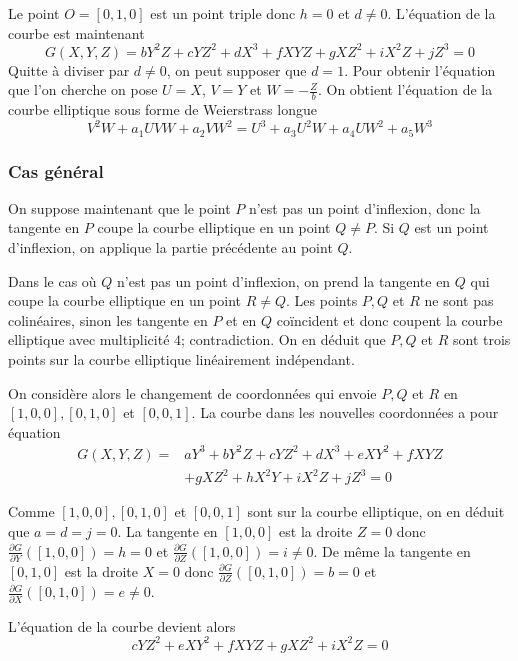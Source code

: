 \documentclass{article}
\begin{document}
Le point $O=[0,1,0]$ est un point triple donc $h=0$ et $d\neq0$. L'équation de la courbe est maintenant
\begin{equation*}
G(X,Y,Z) = bY^2Z + cYZ^2 + dX^3 + fXYZ + gXZ^2 + iX^2Z + jZ^3 = 0
\end{equation*}
Quitte à diviser par $d\neq 0$, on peut supposer que $d=1$. Pour obtenir l'équation que l'on cherche on pose
$U=X$, $V=Y$ et $W=-\frac{Z}{b}$. On obtient l'équation de la courbe elliptique sous forme de Weierstrass longue
\begin{equation*}
V^2W + a_{1}UVW + a_{2}VW^2 = U^3 + a_{3}U^2W + a_{4}UW^2 + a_{5}W^3
\end{equation*}

\subsubsection{Cas général}
On suppose maintenant que le point $P$ n'est pas un point d'inflexion, donc la tangente en $P$ coupe la courbe
elliptique en un point $Q\neq P$. Si $Q$ est un point d'inflexion, on applique la partie précédente au point $Q$.

Dans le cas où $Q$ n'est pas un point d'inflexion, on prend la tangente en $Q$ qui coupe la courbe elliptique 
en un point $R\neq Q$. Les points $P, Q$ et $R$ ne sont pas colinéaires, sinon les tangente en $P$ et en $Q$ coïncident
et donc coupent la courbe elliptique avec multiplicité $4$; contradiction. On en déduit que $P, Q$ et $R$ sont trois
points sur la courbe elliptique linéairement indépendant.

On considère alors le changement de coordonnées qui envoie
$P, Q$ et $R$ en $[1,0,0], [0,1,0]$ et $[0,0,1]$. La courbe dans les nouvelles coordonnées a pour équation
\begin{align*}
G(X,Y,Z) = &aY^3 + bY^2Z + cYZ^2 + dX^3 + eXY^2 + fXYZ \\
			& + gXZ^2 + hX^2Y + iX^2Z + jZ^3 = 0
\end{align*}

Comme $[1,0,0], [0,1,0]$ et $[0,0,1]$ sont sur la courbe elliptique, on en déduit que $a=d=j=0$. La tangente en
$[1,0,0]$ est la droite $Z=0$ donc $\frac{\partial G}{\partial Y}([1,0,0])=h=0$ et 
$\frac{\partial G}{\partial Z}([1,0,0])=i\neq 0$. De même la tangente en $[0,1,0]$ est la droite $X=0$ donc
$\frac{\partial G}{\partial Z}([0,1,0])=b=0$ et $\frac{\partial G}{\partial X}([0,1,0])=e\neq 0$.

L'équation de la courbe devient alors
\begin{equation*}
cYZ^2 + eXY^2 + fXYZ + gXZ^2 + iX^2Z = 0
\end{equation*}
\end{document}
